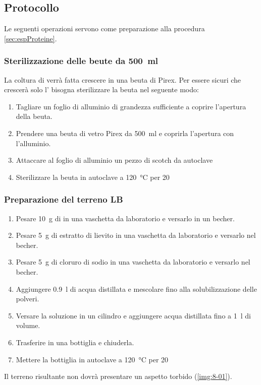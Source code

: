 \subsection{Protocollo}
Le seguenti operazioni servono come preparazione alla procedura \ref{sec:espProteine}.
\subsubsection{Sterilizzazione delle beute da {\boldmath \qty{500}{\ml}}}
La coltura di  verrà fatta crescere in una beuta di Pirex. Per essere sicuri che crescerà solo l' bisogna sterilizzare la beuta nel seguente modo:
\begin{enumerate}
	\item Tagliare un foglio di alluminio di grandezza sufficiente a coprire l’apertura della beuta.
	\item Prendere una beuta di vetro Pirex da \qty{500}{\ml} e coprirla l'apertura con l’alluminio.
	\item Attaccare al foglio di alluminio un pezzo di scotch da autoclave
	\item Sterilizzare la beuta in autoclave a \qty{120}{\celsius} per \qty{20}{\min}
\end{enumerate}

\endgroup

\subsubsection{Preparazione del terreno LB}
\begin{enumerate}
	\item Pesare \qty{10}{\g} di  in una vaschetta da laboratorio e versarlo in un becher.
	\item Pesare \qty{5}{\g} di estratto di lievito in una vaschetta da laboratorio e versarlo nel becher.
	\item Pesare \qty{5}{\g} di cloruro di sodio in una vaschetta da laboratorio e versarlo nel becher.
	\item Aggiungere \qty{0.9}{\l} di acqua distillata e mescolare fino alla solubilizzazione delle polveri.
	\item Versare la soluzione in un cilindro e aggiungere acqua distillata fino a \qty{1}{\litre} di volume.
	\item Trasferire in una bottiglia e chiuderla.
	\item Mettere la bottiglia in autoclave a \qty{120}{\celsius} per \qty{20}{\min}
\end{enumerate}
Il terreno risultante non dovrà presentare un aspetto torbido (\autoref{img:8-01}).

